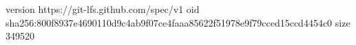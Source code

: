 version https://git-lfs.github.com/spec/v1
oid sha256:800f8937e4690110d9c4ab9f07ce4faaa85622f51978e9f79cced15ccd4454c0
size 349520
